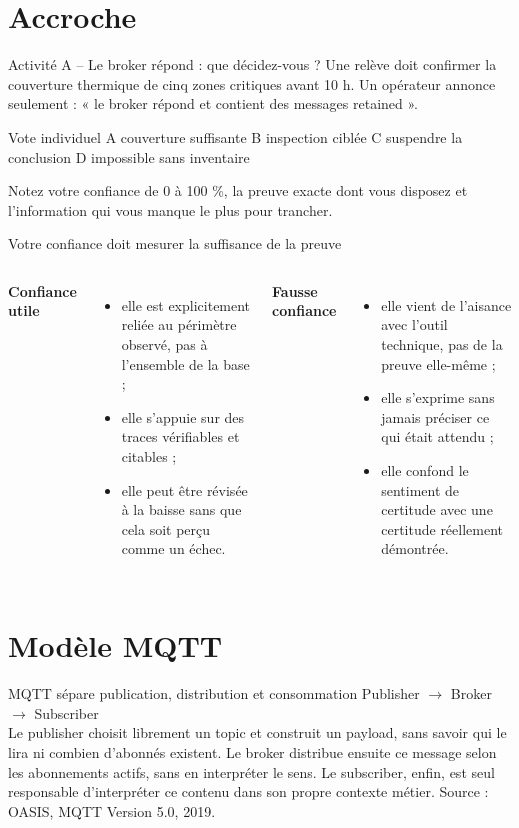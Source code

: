 \documentclass[aspectratio=169]{beamer}
\newcommand{\sourcefoot}[1]{\vfill\tiny\color{gray}Source : #1}
\begin{document}
\section{Accroche}
\begin{frame}{Activité A -- Le broker répond : que décidez-vous ?}
Une relève doit confirmer la couverture thermique de cinq zones critiques avant 10 h. Un opérateur annonce seulement : « le broker répond et contient des messages retained ».
\begin{block}{Vote individuel}
A couverture suffisante \quad B inspection ciblée \quad C suspendre la conclusion \quad D impossible sans inventaire
\end{block}
Notez votre confiance de 0 à 100 \%, la preuve exacte dont vous disposez et l'information qui vous manque le plus pour trancher.
\end{frame}

\begin{frame}{Votre confiance doit mesurer la suffisance de la preuve}
\begin{columns}
\textbf{Confiance utile}
\begin{itemize}
\item elle est explicitement reliée au périmètre observé, pas à l'ensemble de la base ;
\item elle s'appuie sur des traces vérifiables et citables ;
\item elle peut être révisée à la baisse sans que cela soit perçu comme un échec.
\end{itemize}
\textbf{Fausse confiance}
\begin{itemize}
\item elle vient de l'aisance avec l'outil technique, pas de la preuve elle-même ;
\item elle s'exprime sans jamais préciser ce qui était attendu ;
\item elle confond le sentiment de certitude avec une certitude réellement démontrée.
\end{itemize}
\end{columns}
\end{frame}

\section{Modèle MQTT}
\begin{frame}{MQTT sépare publication, distribution et consommation}
\centering\Large Publisher $\rightarrow$ Broker $\rightarrow$ Subscriber\\[1em]
\normalsize Le publisher choisit librement un topic et construit un payload, sans savoir qui le lira ni combien d'abonnés existent. Le broker distribue ensuite ce message selon les abonnements actifs, sans en interpréter le sens. Le subscriber, enfin, est seul responsable d'interpréter ce contenu dans son propre contexte métier.
\sourcefoot{OASIS, MQTT Version 5.0, 2019.}
\end{frame}
\end{document}
